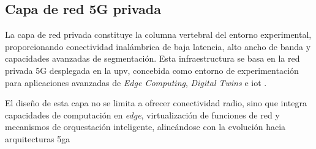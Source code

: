 \subsection{Capa de red 5G privada}
\label{sec:capa_de_red_5g_privada}

La capa de red privada constituye la columna vertebral del entorno experimental, proporcionando conectividad inalámbrica de baja latencia, alto ancho de banda y capacidades avanzadas de segmentación. Esta infraestructura se basa en la red privada 5G desplegada en la \gls{upv}, concebida como entorno de experimentación para aplicaciones avanzadas de \textit{Edge Computing}, \textit{Digital Twins} e \gls{iot} \cite{CrespoAguado2024IoTEdgeCloud} \cite{ITEAM2025Private5G}.

El diseño de esta capa no se limita a ofrecer conectividad radio, sino que integra capacidades de computación en \textit{edge}, virtualización de funciones de red y mecanismos de orquestación inteligente, alineándose con la evolución hacia arquitecturas \gls{5ga} \cite{CrespoAguado2024IoTEdgeCloud}

